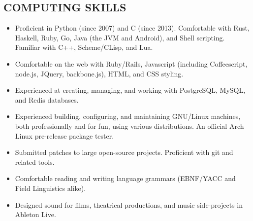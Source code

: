 \documentclass{res}     %
\begin{document}
\begin{resume}

\section{COMPUTING SKILLS}
\vspace{5mm}
\begin{itemize}[leftmargin=5mm]
\item Proficient in Python (since 2007) and C (since 2013). Comfortable with Rust, Haskell, Ruby, Go, Java (the JVM and Android), and Shell scripting. Familiar with C++, Scheme/CLisp, and Lua.
\item Comfortable on the web with Ruby/Rails, Javascript (including Coffeescript, node.js, JQuery, backbone.js), HTML, and CSS styling.
\item Experienced at creating, managing, and working with PostgreSQL, MySQL, and Redis databases.
\item Experienced building, configuring, and maintaining GNU/Linux machines, both professionally and for fun, using various distributions. An official Arch Linux pre-release package tester.
\item Submitted patches to large open-source projects. Proficient with git and related tools.
\item Comfortable reading and writing language grammars (EBNF/YACC and Field Linguistics alike).
\item Designed sound for films, theatrical productions, and music side-projects in Ableton Live.
\end{itemize}


\end{resume}
\end{document}
